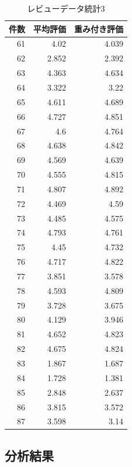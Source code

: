 \clearpage




\begin{table}[htb]
\label{reviewtoukei3}
  \begin{center}
    \caption{レビューデータ統計3}


\begin{tabular}{|r|r|r|}

\hline
件数 & 平均評価 & 重み付き評価 \\
\hline\hline

61 &4.02 &4.039\\
62 &2.852 &2.392\\
63 &4.363 &4.634\\
64 &3.322 &3.22\\
65 &4.611 &4.689\\
66 &4.727 &4.851\\
67 &4.6 &4.764\\
68 &4.638 &4.842\\
69 &4.569 &4.639\\
70 &4.555 &4.815\\
71 &4.807 &4.892\\
72 &4.469 &4.59\\
73 &4.485 &4.575\\
74 &4.793 &4.761\\
75 &4.45 &4.732\\
76 &4.717 &4.822\\
77 &3.851 &3.578\\
78 &4.593 &4.809\\
79 &3.728 &3.675\\
80 &4.129 &3.946\\
81 &4.652 &4.823\\
82 &4.675 &4.824\\
83 &1.867 &1.687\\
84 &1.728 &1.381\\
85 &2.848 &2.637\\
86 &3.815 &3.572\\
87 &3.598 &3.14\\

	\hline
    \end{tabular}
  \end{center}
\end{table}



\clearpage

\subsection{分析結果}

